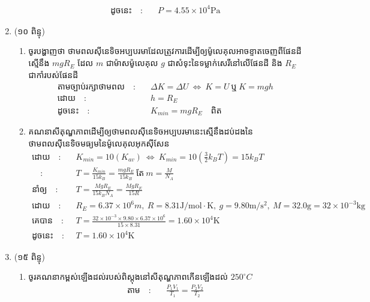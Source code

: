 \documentclass{classes/exam}
\begin{document}
\begin{enumerate}[I]
\begin{enumerate}[k]
\begin{align*}
				\text{ដូចនេះ}\quad :&\quad P=4.55\times 10^{4}\si{\pascal}
			\end{align*}
		\end{enumerate}
			\item {\color{magenta}\ks (១០ ពិន្ទុ)}
		\begin{enumerate}[k]
			\item ចូរបង្ហាញថា ថាមពលសុីនេទិចអប្បបរមាដែលត្រូវការដើម្បីឲ្យម៉ូលេគុលអាចខ្ទាតចេញពីផែនដីស្មើនឹង $mgR_{E}$ ដែល $m$ ជាម៉ាសម៉ូលេគុល $g$ ជាសំទុះនៃទម្លាក់សេរីនៅលើផែនដី និង $R_{E}$ ជាកាំរបស់ផែនដី
			\begin{align*}
				\text{តាមច្បាប់រក្សាថាមពល}\quad :&\quad \Delta K=\Delta U~\Leftrightarrow ~ K=U~\text{ឬ}~K=mgh\\
				\text{ដោយ}\quad :& \quad h=R_{E}\\
				\text{ដូចនេះ}\quad :&\quad K_{min}=mgR_{E}\quad \text{ពិត}
			\end{align*}
			\newpage
			\item គណនាសីតុណ្ហភាពដើម្បីឲ្យថាមពលសុីនេទិចអប្បបរមានេះស្មើនឹងដប់ដងនៃថាមពលសុីនេទិចមធ្យមនៃម៉ូលេគុលអុកសុីសែន
			\begin{align*}
				\text{ដោយ}\quad :&\quad K_{min}=10\left(K_{av}\right)~\Leftrightarrow ~ K_{min}=10\left(\frac{3}{2}k_{B}T\right)=15k_{B}T\\
				\quad :&\quad T=\frac{K_{min}}{15k_{B}}=\frac{mgR_{E}}{15k_{B}}~\text{តែ}~m=\frac{M}{N_{A}}\\
				\text{នាំឲ្យ}\quad :&\quad T=\frac{MgR_{E}}{15k_{B}N_{A}}=\frac{MgR_{E}}{15R}\\
				\text{ដោយ}\quad :& \quad R_{E}=6.37\times 10^{6}m,~R=8.31\si{\joule/\mole\cdot\kelvin},~g=9.80\si{\metre/\second^{2}},~M=32.0\si{\gram}=32\times 10^{-3}\si{\kilogram}\\
				\text{គេបាន}\quad :&\quad T=\frac{32\times 10^{-3}\times 9.80\times 6.37\times 10^{6}}{15\times 8.31}=1.60\times 10^{4}\si{\kelvin}\\
				\text{ដូចនេះ}\quad :&\quad T=1.60\times 10^{4}\si{\kelvin}
			\end{align*}
		\end{enumerate}
		\item {\color{magenta}\ks (១៥ ពិន្ទុ)}
		\begin{enumerate}[k]
			\item ចូរគណនាកម្ពស់ឡើងដល់របស់ពិស្តុងនៅសីតុណ្ហភាពកើនឡើងដល់ $250^\circ C$
			\begin{align*}
				\text{តាម}\quad :&\quad \frac{P_{1}V_{1}}{T_{1}}=\frac{P_{2}V_{2}}{T_{2}}\\

\end{align*}
\end{enumerate}
\end{enumerate}
\end{document}
